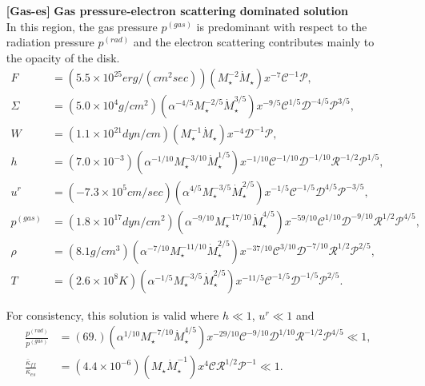 \documentclass[a4paper,fleqn,usenatbib]{mnrasMOD}
\numberwithin{equation}{section}
\begin{document}
\begin{enumerate}
\item[{\bf [Gas-es]}]{\bf Gas pressure-electron scattering dominated solution}\\
In this region, the gas pressure $p^{(gas)}$ is predominant with respect to the radiation pressure $p^{(rad)}$ and the electron scattering contributes mainly to the opacity of the disk. 
\begin{subequations} \label{sol gases}
\begin{align}
F 				&= \left(5.5 \times 10^{25} erg/(cm^2 sec)\right) \left(M_{\star}^{-2} \dot{M}_{\star}\right) x^{-7} \mathcal{C}^{-1} \mathcal{P},\\
\Sigma   &=\left(5.0 \times 10^4 g/cm^2 \right) \left(\alpha^{-4/5} M_{\star}^{-2/5} \dot{M}_{\star}^{3/5}\right) x^{-9/5} \mathcal{C}^{1/5} \mathcal{D}^{-4/5} \mathcal{P}^{3/5},\\
W				&=\left(1.1 \times 10^{21} dyn/cm\right) \left(M_{\star}^{-1} \dot{M}_{\star}\right) x^{-4} \mathcal{D}^{-1} \mathcal{P},\\
h				&=\left(7.0 \times 10^{-3}\right) \left(\alpha^{-1/10} M_{\star}^{-3/10} \dot{M}_{\star}^{1/5}\right) x^{-1/10} \mathcal{C}^{-1/10} \mathcal{D}^{-1/10} \mathcal{R}^{-1/2} \mathcal{P}^{1/5}, \label{h gases}\\
u^{r}		&=\left(-7.3 \times 10^5  cm/sec \right) \left(\alpha^{4/5} M_{\star}^{-3/5} \dot{M}_{\star}^{2/5}\right) x^{-1/5} \mathcal{C}^{-1/5} \mathcal{D}^{4/5} \mathcal{P}^{-3/5},\\
p^{(gas)}&=\left(1.8 \times 10^{17} dyn/cm^2\right) \left(\alpha^{-9/10} M_{\star}^{-17/10} \dot{M}_{\star}^{4/5}\right) x^{-59/10} \mathcal{C}^{1/10} \mathcal{D}^{-9/10} \mathcal{R}^{1/2} \mathcal{P}^{4/5},\\
\rho			&=\left(8.1 g/cm^3\right) \left(\alpha^{-7/10} M_{\star}^{-11/10} \dot{M}_{\star}^{2/5}\right) x^{-37/10} \mathcal{C}^{3/10} \mathcal{D}^{-7/10} \mathcal{R}^{1/2} \mathcal{P}^{2/5},\\
T				&=\left(2.6 \times 10^8 K\right) \left(\alpha^{-1/5} M_{\star}^{-3/5} \dot{M}_{\star}^{2/5}\right) x^{-11/5} \mathcal{C}^{-1/5} \mathcal{D}^{-1/5} \mathcal{P}^{2/5}.
\end{align}
\end{subequations}

For consistency, this solution is valid where $h\ll1$, $u^r \ll1$ and 
\begin{subequations} \label{consistency gases}
\begin{align}  \label{consistency gases1}
\frac{p^{(rad)}}{p^{(gas)}}			&=\left(69.\right) \left(\alpha^{1/10} M_{\star}^{-7/10} \dot{M}_{\star}^{4/5}\right) x^{-29/10} \mathcal{C}^{-9/10} \mathcal{D}^{1/10} \mathcal{R}^{-1/2} \mathcal{P}^{4/5} \ll 1,\\
\frac{\bar{\kappa}_{ff}}{\bar{\kappa}_{es}}			&=\left(4.4 \times 10^{-6}\right) \left(M_{\star} \dot{M}_{\star}^{-1}\right) x^{4} \mathcal{C} \mathcal{R}^{1/2} \mathcal{P}^{-1} \ll1. \label{consistency gases tau}
\end{align}
\end{subequations}




\end{enumerate}
\end{document}
